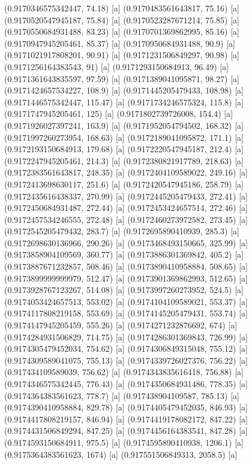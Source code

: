 {{{(0.9170346575342447, 74.18) [a] 
(0.9170483561643817, 75.16) [a] 
(0.9170520547945187, 75.84) [a] 
(0.9170523287671214, 75.85) [a] 
(0.9170550684931488, 83.23) [a] 
(0.9170701369862995, 85.16) [a] 
(0.9170947945205461, 85.37) [a] 
(0.9170950684931488, 90.9) [a] 
(0.9171021917808201, 90.91) [a] 
(0.9171231506849297, 90.98) [a] 
(0.9171256164383543, 91) [a] 
(0.9171293150684913, 96.49) [a] 
(0.9171361643835597, 97.59) [a] 
(0.9171389041095871, 98.27) [a] 
(0.9171424657534227, 108.9) [a] 
(0.9171445205479433, 108.98) [a] 
(0.9171446575342447, 115.47) [a] 
(0.9171734246575324, 115.8) [a] 
(0.9171747945205461, 125) [a] 
(0.9171802739726008, 154.4) [a] 
(0.9171926027397241, 163.9) [a] 
(0.9171952054794502, 168.32) [a] 
(0.9171997260273954, 168.63) [a] 
(0.9172189041095872, 171.1) [a] 
(0.9172193150684913, 179.68) [a] 
(0.9172220547945187, 212.4) [a] 
(0.9172247945205461, 214.3) [a] 
(0.9172380821917789, 218.63) [a] 
(0.9172383561643817, 248.35) [a] 
(0.9172404109589022, 249.16) [a] 
(0.9172413698630117, 251.6) [a] 
(0.9172420547945186, 258.79) [a] 
(0.9172435616438337, 270.99) [a] 
(0.9172445205479433, 272.41) [a] 
(0.9172450684931487, 272.44) [a] 
(0.9172453424657514, 272.46) [a] 
(0.9172457534246555, 272.48) [a] 
(0.9172460273972582, 273.45) [a] 
(0.9172545205479432, 283.7) [a] 
(0.9172695890410939, 285.3) [a] 
(0.9172698630136966, 290.26) [a] 
(0.9173468493150665, 325.99) [a] 
(0.9173858904109569, 360.77) [a] 
(0.9173886301369842, 405.2) [a] 
(0.9173887671232857, 508.46) [a] 
(0.9173890410958884, 508.65) [a] 
(0.9173899999999979, 512.47) [a] 
(0.9173901369862993, 512.65) [a] 
(0.9173928767123267, 514.08) [a] 
(0.9173997260273952, 524.5) [a] 
(0.9174053424657513, 553.02) [a] 
(0.9174104109589021, 553.37) [a] 
(0.9174117808219158, 553.69) [a] 
(0.9174145205479431, 553.74) [a] 
(0.9174147945205459, 555.26) [a] 
(0.9174271232876692, 674) [a] 
(0.9174284931506829, 714.75) [a] 
(0.9174286301369843, 726.99) [a] 
(0.9174305479452034, 754.62) [a] 
(0.9174306849315048, 755.12) [a] 
(0.9174309589041075, 755.13) [a] 
(0.9174339726027376, 756.22) [a] 
(0.917434109589039, 756.62) [a] 
(0.9174343835616418, 756.88) [a] 
(0.9174346575342445, 776.43) [a] 
(0.9174350684931486, 778.35) [a] 
(0.9174364383561623, 778.7) [a] 
(0.917438904109587, 785.13) [a] 
(0.9174390410958884, 829.78) [a] 
(0.9174405479452035, 846.93) [a] 
(0.9174417808219157, 846.94) [a] 
(0.9174419178082172, 847.22) [a] 
(0.9174431506849294, 847.25) [a] 
(0.9174456164383541, 847.28) [a] 
(0.9174593150684911, 975.5) [a] 
(0.9174595890410938, 1206.1) [a] 
(0.9175364383561623, 1674) [a] 
(0.917551506849313, 2058.5) [a] 
}}}
